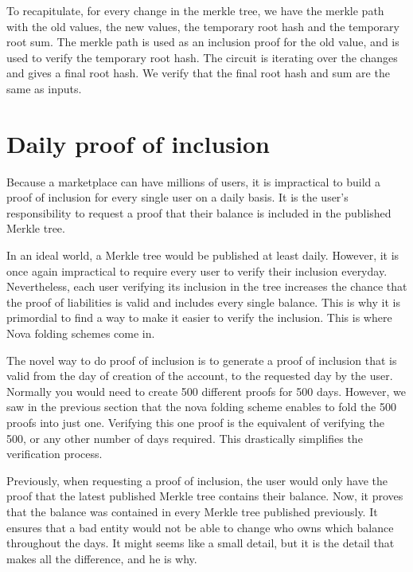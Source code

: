 To recapitulate, for every change in the merkle tree, we have the merkle path with the old values, the new values, the temporary root hash and
the temporary root sum. 
The merkle path is used as an inclusion proof for the old value, and is used to verify the temporary root hash.
The circuit is iterating over the changes and gives a final root hash. We verify that the final root hash and sum are the same as inputs.




\section{Daily proof of inclusion} 

Because a marketplace can have millions of users, it is impractical to build a proof of inclusion for every single user on a daily basis. 
It is the user's responsibility to request a proof that their balance is included in the published Merkle tree.

In an ideal world, a Merkle tree would be published at least daily. However, it is once again impractical to require every user to verify their inclusion everyday. 
Nevertheless, each user verifying its inclusion in the tree increases the chance that the proof of liabilities is valid and includes every single balance. 
This is why it is primordial to find a way to make it easier to verify the inclusion. This is where Nova folding schemes come in.

The novel way to do proof of inclusion is to generate a proof of inclusion that is valid from the day of creation of the account, to the requested day by the user. 
Normally you would need to create 500 different proofs for 500 days. However, we saw in the previous section that the nova folding scheme enables to fold the 500 proofs into just one.
Verifying this one proof is the equivalent of verifying the 500, or any other number of days required. 
This drastically simplifies the verification process.



Previously, when requesting a proof of inclusion, the user would only have the proof that the latest published Merkle tree contains their balance. 
Now, it proves that the balance was contained in every Merkle tree published previously. 
It ensures that a bad entity would not be able to change who owns which balance throughout the days. It might seems like a small detail, but it is the detail that makes all the difference, and he is why.

